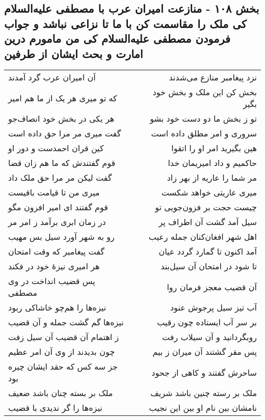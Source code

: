 \begin{center}
\section*{بخش ۱۰۸ - منازعت امیران عرب با مصطفی علیه‌السلام کی ملک را مقاسمت کن با ما تا نزاعی نباشد و جواب فرمودن مصطفی علیه‌السلام کی من مامورم درین امارت و بحث ایشان از طرفین}
\label{sec:sh108}
\begin{longtable}{l p{0.5cm} r}
آن امیران عرب گرد آمدند
&&
نزد پیغامبر منازع می‌شدند
\\
که تو میری هر یک از ما هم امیر
&&
بخش کن این ملک و بخش خود بگیر
\\
هر یکی در بخش خود انصاف‌جو
&&
تو ز بخش ما دو دست خود بشو
\\
گفت میری مر مرا حق داده است
&&
سروری و امر مطلق داده است
\\
کین قران احمدست و دور او
&&
هین بگیرید امر او را اتقوا
\\
قوم گفتندش که ما هم زان قضا
&&
حاکمیم و داد امیریمان خدا
\\
گفت لیکن مر مرا حق ملک داد
&&
مر شما را عاریه از بهر زاد
\\
میری من تا قیامت باقیست
&&
میری عاریتی خواهد شکست
\\
قوم گفتند ای امیر افزون مگو
&&
چیست حجت بر فزون‌جویی تو
\\
در زمان ابری برآمد ز امر مر
&&
سیل آمد گشت آن اطراف پر
\\
رو به شهر آورد سیل بس مهیب
&&
اهل شهر افغان‌کنان جمله رعیب
\\
گفت پیغامبر که وقت امتحان
&&
آمد اکنون تا گمارد گردد عیان
\\
هر امیری نیزهٔ خود در فکند
&&
تا شود در امتحان آن سیل‌بند
\\
پس قضیب انداخت در وی مصطفی
&&
آن قضیب معجز فرمان روا
\\
نیزه‌ها را هم‌چو خاشاکی ربود
&&
آب تیز سیل پرجوش عنود
\\
نیزه‌ها گم گشت جمله و آن قضیب
&&
بر سر آب ایستاده چون رقیب
\\
ز اهتمام آن قضیب آن سیل زفت
&&
روبگردانید و آن سیلاب رفت
\\
چون بدیدند از وی آن امر عظیم
&&
پس مقر گشتند آن میران ز بیم
\\
جز سه کس که حقد ایشان چیره بود
&&
ساحرش گفتند و کاهی از جحود
\\
ملک بر بسته چنان باشد ضعیف
&&
ملک بر رسته چنین باشد شریف
\\
نیزه‌ها را گر ندیدی با قضیب
&&
نامشان بین نام او بین این نجیب
\\

\end{longtable}
\end{center}

